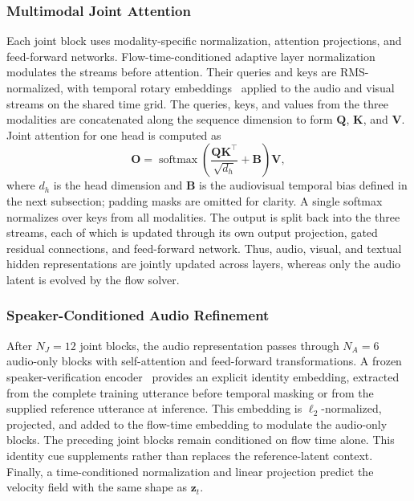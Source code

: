 \subsubsection{Multimodal Joint Attention}
\label{subsubsec:mmdit_joint}
Each joint block uses modality-specific normalization, attention projections,
and feed-forward networks. Flow-time-conditioned adaptive layer
normalization~\cite{peebles2023dit} modulates the streams before attention.
Their queries and keys are RMS-normalized, with temporal rotary
embeddings~\cite{su2024roformer} applied to the audio and visual streams
on the shared time grid. The queries, keys, and values from the three
modalities are concatenated along the sequence dimension to form
$\mathbf{Q}$, $\mathbf{K}$, and $\mathbf{V}$. Joint attention for one head
is computed as
\begin{equation}
\mathbf{O}=\operatorname{softmax}\!\left(
\frac{\mathbf{Q}\mathbf{K}^{\top}}{\sqrt{d_h}}+\mathbf{B}
\right)\mathbf{V},
\label{eq:mmdit_joint_attention}
\end{equation}
where $d_h$ is the head dimension and $\mathbf{B}$ is the audiovisual
temporal bias defined in the next subsection; padding masks are omitted
for clarity. A single softmax normalizes over keys from all modalities.
The output is split back into the three streams, each of which is updated
through its own output projection, gated residual connections, and
feed-forward network. Thus, audio, visual, and textual hidden representations
are jointly updated across layers, whereas only the audio latent is evolved
by the flow solver.

\subsubsection{Speaker-Conditioned Audio Refinement}
\label{subsubsec:mmdit_refinement}
After $N_J=12$ joint blocks, the audio representation passes through $N_A=6$ audio-only
blocks with self-attention and feed-forward transformations. A frozen
speaker-verification encoder~\cite{wang2023campplus} provides an
explicit identity embedding, extracted from the complete training utterance
before temporal masking or from the supplied reference utterance at
inference. This embedding is $\ell_2$-normalized, projected, and added to
the flow-time embedding to modulate the audio-only blocks. The preceding
joint blocks remain conditioned on flow time alone. This identity cue
supplements rather than replaces the reference-latent context. Finally, a
time-conditioned normalization and linear projection predict the velocity
field with the same shape as $\mathbf{z}_t$.

